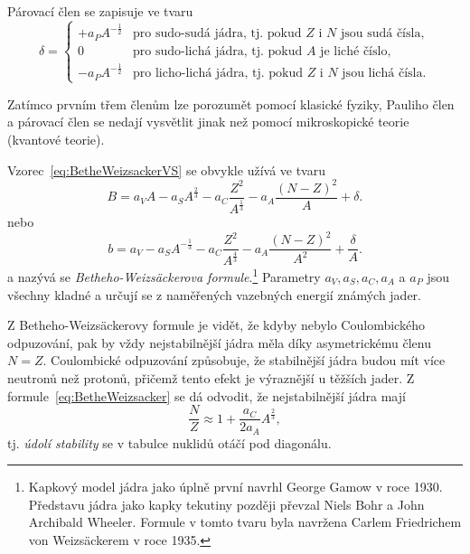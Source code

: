 \documentclass[a4paper,12pt,oneside]{article}
\theoremstyle{red}
\begin{document}
\begin{itemize}
            Párovací člen se zapisuje ve tvaru
            \begin{equation}
                \delta=\begin{cases}
                    +a_{P}A^{-\frac{1}{2}} & \text{pro sudo-sudá jádra, tj. pokud $Z$ i $N$ jsou sudá čísla,} \\
                    0 & \text{pro sudo-lichá jádra, tj. pokud $A$ je liché číslo,} \\
                    -a_{P}A^{-\frac{1}{2}} & \text{pro licho-lichá jádra, tj. pokud $Z$ i $N$ jsou lichá čísla.}
                    \end{cases}
            \end{equation}
        \end{itemize}

    Zatímco prvním třem členům lze porozumět pomocí klasické fyziky, Pauliho člen a párovací člen se nedají vysvětlit jinak než pomocí mikroskopické teorie (kvantové teorie).

    Vzorec~\eqref{eq:BetheWeizsackerVS} se obvykle užívá ve tvaru
    \begin{equation}
        \label{eq:BetheWeizsacker}
        B=a_{V}A-a_{S}A^{\frac{2}{3}}-a_{C}\frac{Z^{2}}{A^{\frac{1}{3}}}-a_{A}\frac{\left(N-Z\right)^{2}}{A}+\delta.
    \end{equation}
    nebo
    \begin{equation}
        \label{eq:BetheWeizsackerA}
        b=a_{V}-a_{S}A^{-\frac{1}{3}}-a_{C}\frac{Z^{2}}{A^{\frac{4}{3}}}-a_{A}\frac{\left(N-Z\right)^{2}}{A^{2}}+\frac{\delta}{A}.
    \end{equation}
    a nazývá se \emph{Betheho-Weizsäckerova formule}.\footnote{Kapkový model jádra jako úplně první navrhl George Gamow v roce 1930. Představu jádra jako kapky tekutiny později převzal Niels Bohr a John Archibald Wheeler. Formule v tomto tvaru byla navržena Carlem Friedrichem von Weizsäckerem v roce 1935.}
    Parametry $a_{V},a_{S},a_{C},a_{A}$ a $a_{P}$ jsou všechny kladné a určují se z naměřených vazebných energií známých jader.

    Z Betheho-Weizsäckerovy formule je vidět, že kdyby nebylo Coulombického odpuzování, pak by vždy nejstabilnější jádra měla díky asymetrickému členu $N=Z$.        
    Coulombické odpuzování způsobuje, že stabilnější jádra budou mít více neutronů než protonů, přičemž tento efekt je výraznější u těžších jader.
    Z formule~\eqref{eq:BetheWeizsacker} se dá odvodit, že nejstabilnější jádra mají 
    \begin{equation}
        \label{eq:Valley}
        \frac{N}{Z}\approx 1+\frac{a_{C}}{2a_{A}}A^{\frac{2}{3}},
    \end{equation}
    tj. \emph{údolí stability} se v tabulce nuklidů otáčí pod diagonálu.
\end{document}
